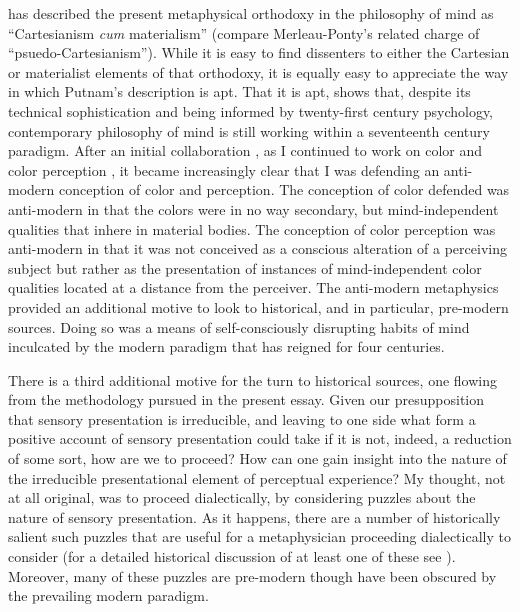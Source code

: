 \citet{Putnam:1993kx,Putnam:1994kx,Putnam:1999eu} has described the present metaphysical orthodoxy in the philosophy of mind as ``Cartesianism \emph{cum} materialism'' (compare Merleau-Ponty's \citeyear{Merleau-Ponty:1967fj} related charge of ``psuedo-Cartesianism''). While it is easy to find dissenters to either the Cartesian or materialist elements of that orthodoxy, it is equally easy to appreciate the way in which Putnam's description is apt. That it is apt, shows that, despite its technical sophistication and being informed by twenty-first century psychology, contemporary philosophy of mind is still working within a seventeenth century paradigm. After an initial collaboration \citep{Hilbert:2000on}, as I continued to work on color and color perception \citep{Kalderon:2006tg,Kalderon:2008fk,Kalderon:2007mr,Kalderon:2010fj,Kalderon:2011fk}, it became increasingly clear that I was defending an anti-modern conception of color and perception. The conception of color defended was anti-modern in that the colors were in no way secondary, but mind-independent qualities that inhere in material bodies. The conception of color perception was anti-modern in that it was not conceived as a conscious alteration of a perceiving subject but rather as the presentation of instances of mind-independent color qualities located at a distance from the perceiver. The anti-modern metaphysics provided an additional motive to look to historical, and in particular, pre-modern sources. Doing so was a means of self-consciously disrupting habits of mind inculcated by the modern paradigm that has reigned for four centuries. 

There is a third additional motive for the turn to historical sources, one flowing from the methodology pursued in the present essay. Given our presupposition that sensory presentation is irreducible, and leaving to one side what form a positive account of sensory presentation could take if it is not, indeed, a reduction of some sort, how are we to proceed? How can one gain insight into the nature of the irreducible presentational element of perceptual experience? My thought, not at all original, was to proceed dialectically, by considering puzzles about the nature of sensory presentation. As it happens, there are a number of historically salient such puzzles that are useful for a metaphysician proceeding dialectically to consider (for a detailed historical discussion of at least one of these see \citealt{Kalderon:2015fr}). Moreover, many of these puzzles are pre-modern though have been obscured by the prevailing modern paradigm.

